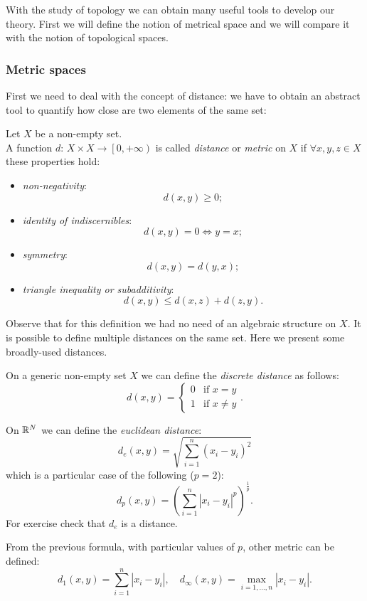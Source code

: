 With the study of topology we can obtain many useful tools to develop our theory. First we will define the notion of metrical space and we will compare it with the notion of topological spaces.
\subsubsection{Metric spaces}

First we need to deal with the concept of distance: we have to obtain an abstract tool to quantify how close are two elements of the same set:
\begin{defn}
	Let $X$ be a non-empty set.\\
	A function $d:\, X\times X \to \left[0,+\infty\right)$ is called \emph{distance} or \emph{metric} on $X$ if $\forall x,y,z \in X$ these properties hold:
	\begin{itemize}
		\item \emph{non-negativity}:																
		$$d(x,y)\geq0;$$
		\item \emph{identity of indiscernibles}:\footnotemark{}
		$$d(x,y)=0 \iff y=x;$$
		\item \emph{symmetry}:																		
		$$d(x,y)=d(y,x);$$
		\item \emph{triangle inequality or subadditivity}:											
		$$d(x,y) \leq d(x, z) + d(z, y).$$
	\end{itemize}
\end{defn}
Observe that for this definition we had no need of an algebraic structure on $X$. It is possible to define multiple distances on the same set. Here we present some broadly-used distances. 
\begin{exam}
	On a generic non-empty set $X$ we can define the \emph{discrete distance}  as follows:
	$$ 
		d\left(x,y\right) = 
		\begin{cases}
			0 & \text{if } x = y \\
			1 & \text{if } x \neq y
		\end{cases}
	.
	$$
\end{exam}
\begin{exam}
	On $\mathbb R^N$ we can define the \emph{euclidean distance}:
	$$d_e(x,y) =\sqrt{\sum_{i=1}^{n}(x_i-y_i)^2}$$
	which is a particular case of the following ($p=2$):
	$$d_p(x,y) = \left(\sum_{i=1}^{n}|x_i-y_i|^p\right)^\frac 1 p.$$
	For exercise check that $d_e$ is a distance.\footnotemark{}
\end{exam}
\begin{exam}
	From the previous formula, with particular values of $p$, other metric can be defined:
	$$
		d_1(x,y) 
		= \sum_{i=1}^{n}|x_i-y_i|, 
		\quad d_\infty(x,y) 
		= \max_{i=1, \ldots, n}|x_i-y_i|
	.
	$$
\end{exam}


